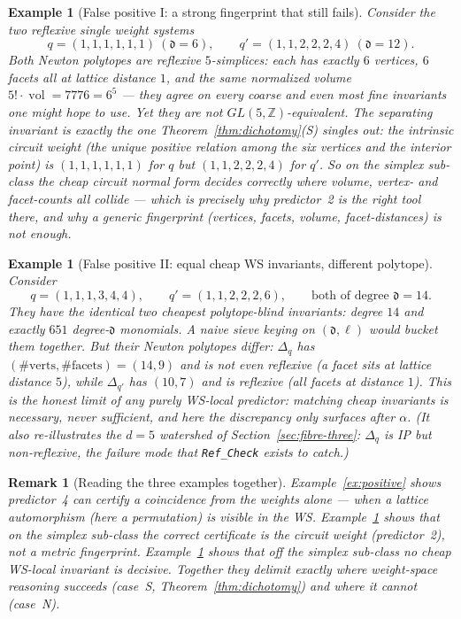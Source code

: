 \documentclass{amsart}
\newtheorem{example}[theorem]{Example}
\newtheorem{remark}[theorem]{Remark}
\begin{document}
\begin{example}[False positive I: a strong fingerprint that still fails]
\label{ex:fp1}
Consider the two reflexive single weight systems
\[
  q=(1,1,1,1,1,1)\ (\mathfrak d=6),
  \qquad
  q'=(1,1,2,2,2,4)\ (\mathfrak d=12).
\]
Both Newton polytopes are reflexive $5$-\emph{simplices}: each has
\emph{exactly} $6$ vertices, $6$ facets all at lattice distance $1$, and the
\emph{same} normalized volume $5!\cdot\operatorname{vol}=7776=6^{5}$ --- they
agree on every coarse and even most fine invariants one might hope to use.
\emph{Yet they are not $GL(5,\mathbb Z)$-equivalent.} The separating invariant is
exactly the one Theorem~\ref{thm:dichotomy}(S) singles out: the intrinsic
circuit weight (the unique positive relation among the six vertices and the
interior point) is $(1,1,1,1,1,1)$ for $q$ but $(1,1,2,2,2,4)$ for $q'$. So on
the simplex sub-class the cheap circuit normal form decides correctly where
volume, vertex- and facet-counts all collide --- which is precisely why
predictor~2 is the right tool there, and why a generic fingerprint (vertices,
facets, volume, facet-distances) is \emph{not} enough.
\end{example}

\begin{example}[False positive II: equal cheap WS invariants, different polytope]
\label{ex:fp2}
Consider
\[
  q=(1,1,1,3,4,4),
  \qquad
  q'=(1,1,2,2,2,6),
  \qquad \text{both of degree } \mathfrak d=14 .
\]
They have the \emph{identical} two cheapest polytope-blind invariants: degree
$14$ and exactly $651$ degree-$\mathfrak d$ monomials. A naive sieve keying on
$(\mathfrak d,\ell)$ would bucket them together. But their Newton polytopes
differ: $\Delta_q$ has $(\#\text{verts},\#\text{facets})=(14,9)$ and is
\emph{not even reflexive} (a facet sits at lattice distance $5$), while
$\Delta_{q'}$ has $(10,7)$ and \emph{is} reflexive (all facets at distance $1$).
This is the honest limit of any purely WS-local predictor: matching cheap
invariants is necessary, never sufficient, and here the discrepancy only
surfaces after $\alpha$. (It also re-illustrates the $d=5$ watershed of
Section~\ref{sec:fibre-three}: $\Delta_q$ is IP but non-reflexive, the failure
mode that \texttt{Ref\_Check} exists to catch.)
\end{example}

\begin{remark}[Reading the three examples together]\label{rmk:worked}
Example~\ref{ex:positive} shows predictor~4 \emph{can} certify a coincidence
from the weights alone --- when a lattice automorphism (here a permutation) is
visible in the WS. Example~\ref{ex:fp1} shows that on the simplex sub-class the
\emph{correct} certificate is the circuit weight (predictor~2), not a metric
fingerprint. Example~\ref{ex:fp2} shows that off the simplex sub-class no cheap
WS-local invariant is decisive. Together they delimit exactly where weight-space
reasoning succeeds (case~S, Theorem~\ref{thm:dichotomy}) and where it cannot
(case~N).
\end{remark}
\end{document}
